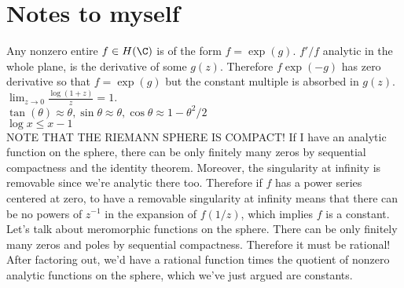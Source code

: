 \documentclass[11pt]{book}
\theoremstyle{definition}
\begin{document}
\section{Notes to myself}
Any nonzero entire $f\in H(\C)$ is of the form $f=\exp(g)$. $f'/f$ analytic in the whole plane, is the derivative of some $g(z)$. Therefore $f\exp(-g)$ has zero derivative so that $f=\exp(g)$ but the constant multiple is absorbed in $g(z)$.\\
$\lim_{z\to0}\frac{\log{(1+z)}}{z}=1$.
\\$\tan(\theta)\approx\theta,\sin\theta\approx\theta,\cos\theta\approx1-\theta^2/2$
\\$\log x\leq x-1$
\\ NOTE THAT THE RIEMANN SPHERE IS COMPACT! If I have an analytic function on the sphere, there can be only finitely many zeros by sequential compactness and the identity theorem. Moreover, the singularity at infinity is removable since we're analytic there too. Therefore if $f$ has a power series centered at zero, to have a removable singularity at infinity means that there can be no powers of $z^{-1}$ in the expansion of $f(1/z)$, which implies $f$ is a constant.
\\ Let's talk about meromorphic functions on the sphere. There can be only finitely many zeros and poles by sequential compactness. Therefore it must be rational! After factoring out, we'd have a rational function times the quotient of nonzero analytic functions on the sphere, which we've just argued are constants. 
\end{document}

